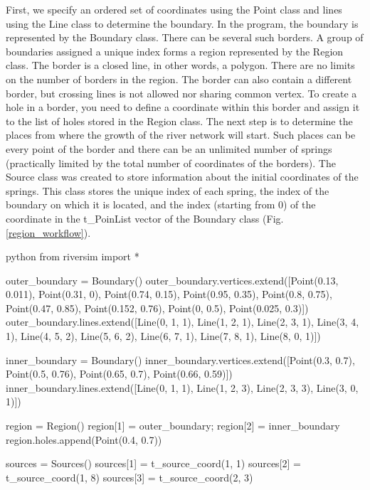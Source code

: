\documentclass[]{pracamgr}
\begin{document}
      First, we specify an ordered set of coordinates using the Point class and lines using the Line class to determine the boundary. In the program, the boundary is represented by the Boundary class. There can be several such borders. A group of boundaries assigned a unique index forms a region represented by the Region class. The border is a closed line, in other words, a polygon. There are no limits on the number of borders in the region. The border can also contain a different border, but crossing lines is not allowed nor sharing common vertex. To create a hole in a border, you need to define a coordinate within this border and assign it to the list of holes stored in the Region class. The next step is to determine the places from where the growth of the river network will start. Such places can be every point of the border and there can be an unlimited number of springs (practically limited by the total number of coordinates of the borders). The Source class was created to store information about the initial coordinates of the springs. This class stores the unique index of each spring, the index of the boundary on which it is located, and the index (starting from $0$) of the coordinate in the t\_PoinList vector of the Boundary class (Fig. \ref{region_workflow}).

      \begin{mintedbox}{python}
        from riversim import *

        outer_boundary = Boundary()
        outer_boundary.vertices.extend([Point(0.13, 0.011), Point(0.31, 0), Point(0.74, 0.15), Point(0.95, 0.35), Point(0.8, 0.75), Point(0.47, 0.85), Point(0.152, 0.76), Point(0, 0.5), Point(0.025, 0.3)])
        outer_boundary.lines.extend([Line(0, 1, 1), Line(1, 2, 1), Line(2, 3, 1), Line(3, 4, 1), Line(4, 5, 2), Line(5, 6, 2), Line(6, 7, 1), Line(7, 8, 1), Line(8, 0, 1)])

        inner_boundary = Boundary()
        inner_boundary.vertices.extend([Point(0.3, 0.7), Point(0.5, 0.76), Point(0.65, 0.7), Point(0.66, 0.59)])
        inner_boundary.lines.extend([Line(0, 1, 1), Line(1, 2, 3), Line(2, 3, 3), Line(3, 0, 1)])

        region = Region()
        region[1] = outer_boundary; region[2] = inner_boundary
        region.holes.append(Point(0.4, 0.7))

        sources = Sources()
        sources[1] = t_source_coord(1, 1) 
        sources[2] = t_source_coord(1, 8) 
        sources[3] = t_source_coord(2, 3)\end{mintedbox}
\end{document}
